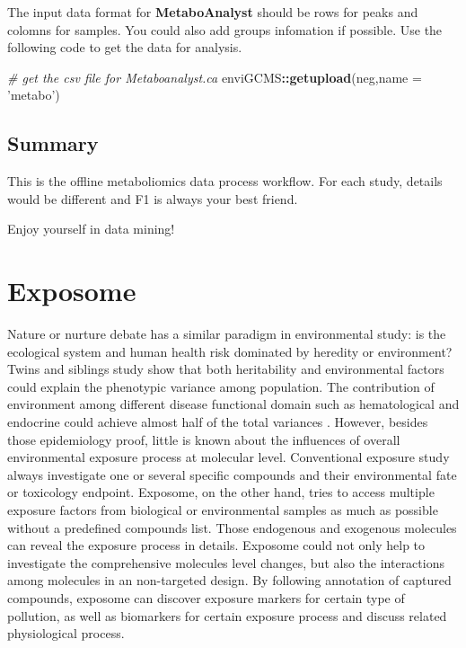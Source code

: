\documentclass[
]{book}
\newenvironment{Shaded}{\begin{snugshade}}{\end{snugshade}}
\newcommand{\CommentTok}[1]{\textcolor[rgb]{0.56,0.35,0.01}{\textit{#1}}}
\newcommand{\DataTypeTok}[1]{\textcolor[rgb]{0.13,0.29,0.53}{#1}}
\newcommand{\KeywordTok}[1]{\textcolor[rgb]{0.13,0.29,0.53}{\textbf{#1}}}
\newcommand{\NormalTok}[1]{#1}
\newcommand{\OperatorTok}[1]{\textcolor[rgb]{0.81,0.36,0.00}{\textbf{#1}}}
\newcommand{\StringTok}[1]{\textcolor[rgb]{0.31,0.60,0.02}{#1}}
\begin{document}
The input data format for \textbf{MetaboAnalyst} should be rows for peaks and colomns for samples. You could also add groups infomation if possible. Use the following code to get the data for analysis.

\begin{Shaded}
\begin{Highlighting}[]
\CommentTok{# get the csv file for Metaboanalyst.ca}
\NormalTok{enviGCMS}\OperatorTok{::}\KeywordTok{getupload}\NormalTok{(neg,}\DataTypeTok{name =} \StringTok{'metabo'}\NormalTok{)}
\end{Highlighting}
\end{Shaded}

\hypertarget{summary}{%
\section{Summary}\label{summary}}

This is the offline metaboliomics data process workflow. For each study, details would be different and F1 is always your best friend.

Enjoy yourself in data mining!

\hypertarget{exposome}{%
\chapter{Exposome}\label{exposome}}

Nature or nurture debate has a similar paradigm in environmental study: is the ecological system and human health risk dominated by heredity or environment? Twins and siblings study\citep{lakhani2019, polderman2015} show that both heritability and environmental factors could explain the phenotypic variance among population. The contribution of environment among different disease functional domain such as hematological and endocrine could achieve almost half of the total variances \citep{polderman2015}. However, besides those epidemiology proof, little is known about the influences of overall environmental exposure process at molecular level. Conventional exposure study always investigate one or several specific compounds and their environmental fate or toxicology endpoint. Exposome, on the other hand, tries to access multiple exposure factors from biological or environmental samples as much as possible without a predefined compounds list. Those endogenous and exogenous molecules can reveal the exposure process in details. Exposome could not only help to investigate the comprehensive molecules level changes, but also the interactions among molecules in an non-targeted design. By following annotation of captured compounds, exposome can discover exposure markers for certain type of pollution, as well as biomarkers for certain exposure process and discuss related physiological process.
\end{document}
